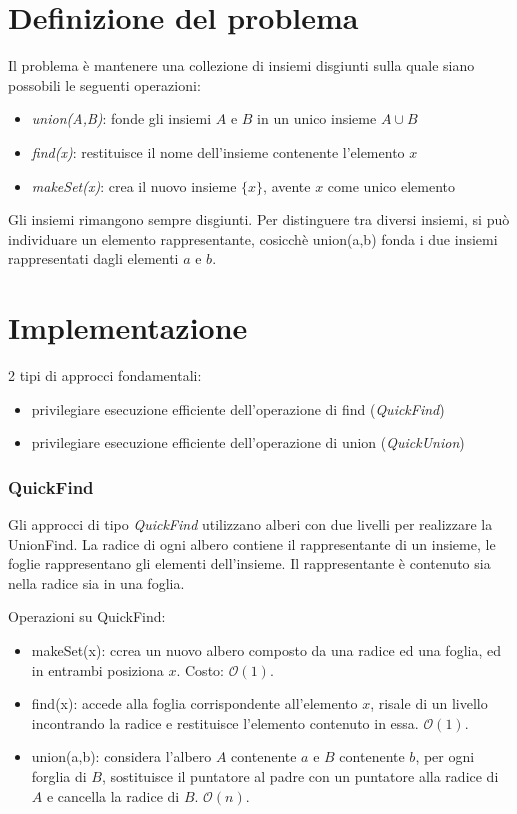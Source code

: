 \documentclass[11pt]{book}
\begin{document}
\section{Definizione del problema}
Il problema è mantenere una collezione di insiemi disgiunti sulla quale siano possobili le seguenti operazioni: 
\begin{itemize}
    \item \textit{union(A,B)}: fonde gli insiemi $A$ e $B$ in un unico insieme $A \cup B$
    \item \textit{find(x)}: restituisce il nome dell'insieme contenente l'elemento $x$
    \item \textit{makeSet(x)}: crea il nuovo insieme $\{x\}$, avente $x$ come unico elemento
\end{itemize}
Gli insiemi rimangono sempre disgiunti. Per distinguere tra diversi insiemi, si può individuare un elemento rappresentante,
cosicchè union(a,b) fonda i due insiemi rappresentati dagli elementi $a$ e $b$.
\section{Implementazione}
2 tipi di approcci fondamentali:
\begin{itemize}
    \item privilegiare esecuzione efficiente dell'operazione di find (\textit{QuickFind})
    \item privilegiare esecuzione efficiente dell'operazione di union (\textit{QuickUnion})
\end{itemize}
\subsubsection{QuickFind}
Gli approcci di tipo \textit{QuickFind} utilizzano alberi con due livelli per realizzare la UnionFind. La radice di ogni 
albero contiene il rappresentante di un insieme, le foglie rappresentano gli elementi dell'insieme. Il rappresentante è 
contenuto sia nella radice sia in una foglia.

Operazioni su QuickFind:
\begin{itemize}
    \item makeSet(x): ccrea un nuovo albero composto da una radice ed una foglia, ed in entrambi posiziona $x$. Costo: 
    $\mathcal{O}(1)$.
    \item find(x): accede alla foglia corrispondente all'elemento $x$, risale di un livello incontrando la radice e restituisce 
    l'elemento contenuto in essa. $\mathcal{O}(1)$.
    \item union(a,b): considera l'albero $A$ contenente $a$ e $B$ contenente $b$, per ogni forglia di $B$, sostituisce il 
    puntatore al padre con un puntatore alla radice di $A$ e cancella la radice di $B$. $\mathcal{O}(n)$.
\end{itemize}
\end{document}
